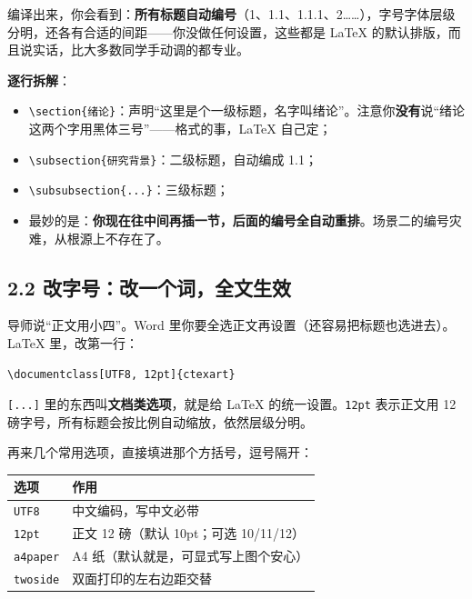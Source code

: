 编译出来，你会看到：\textbf{所有标题自动编号}（1、1.1、1.1.1、2……），字号字体层级分明，还各有合适的间距——你没做任何设置，这些都是 LaTeX 的默认排版，而且说实话，比大多数同学手动调的都专业。

\textbf{逐行拆解}：

\begin{itemize}
\setlength{\itemsep}{2pt}
\item \texttt{\textbackslash{}section\{绪论\}}：声明“这里是个一级标题，名字叫绪论”。注意你\textbf{没有}说“绪论这两个字用黑体三号”——格式的事，LaTeX 自己定；
\item \texttt{\textbackslash{}subsection\{研究背景\}}：二级标题，自动编成 1.1；
\item \texttt{\textbackslash{}subsubsection\{...\}}：三级标题；
\item 最妙的是：\textbf{你现在往中间再插一节，后面的编号全自动重排}。场景二的编号灾难，从根源上不存在了。
\end{itemize}

\subsection*{2.2 改字号：改一个词，全文生效}

导师说“正文用小四”。Word 里你要全选正文再设置（还容易把标题也选进去）。LaTeX 里，改第一行：

\begin{lstlisting}
\documentclass[UTF8, 12pt]{ctexart}
\end{lstlisting}

\texttt{[...]} 里的东西叫\textbf{文档类选项}，就是给 LaTeX 的统一设置。\texttt{12pt} 表示正文用 12 磅字号，所有标题会按比例自动缩放，依然层级分明。

再来几个常用选项，直接填进那个方括号，逗号隔开：

\begin{table}[htbp]
\centering
\small
\begin{tabularx}{\linewidth}{@{}*{2}{>{\raggedright\arraybackslash}X}@{}}
\toprule
\textbf{选项} & \textbf{作用} \\
\midrule
\texttt{UTF8} & 中文编码，写中文必带 \\
\texttt{12pt} & 正文 12 磅（默认 10pt；可选 10/11/12） \\
\texttt{a4paper} & A4 纸（默认就是，可显式写上图个安心） \\
\texttt{twoside} & 双面打印的左右边距交替 \\
\bottomrule
\end{tabularx}
\end{table}


